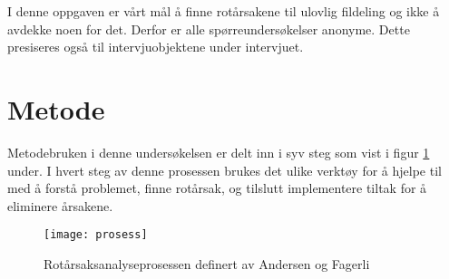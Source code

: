 I denne oppgaven er vårt mål å finne rotårsakene til ulovlig fildeling og ikke å avdekke noen for det. Derfor er alle spørreundersøkelser anonyme. Dette presiseres også til intervjuobjektene under intervjuet.

\section{Metode}
Metodebruken i denne undersøkelsen er delt inn i syv steg som vist i figur \ref{fig:prosess} under. I hvert steg av denne prosessen brukes det ulike verktøy for å hjelpe til med å forstå problemet, finne rotårsak, og tilslutt implementere tiltak for å eliminere årsakene. 
\begin{figure}[H]
    \centering
    \texttt{[image: prosess]}
    \label{fig:prosess}
    \caption[Rotårsaksanalyseprosessen]{Rotårsaksanalyseprosessen definert av Andersen og Fagerli}
\end{figure}